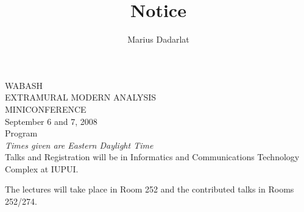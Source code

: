 \documentclass[10pt]{article}                                  %
\title{Notice}                                               %
\author{Marius Dadarlat}                                          %
\begin{document}
\vspace{2ex}
\begin{center}
{\TitleFont WABASH}\\
\smallskip
{\SubTitleFont EXTRAMURAL MODERN ANALYSIS}\\
\smallskip
{\TitleFont MINICONFERENCE}\\
\vspace{.2in}
 {\DateFont   September 6 and 7, 2008}\\
\vspace{.2in}
{\TitleFont Program}\\[.2in]

{\em Times given are Eastern Daylight Time}\\[.3in]


Talks and Registration will be in Informatics and Communications Technology Complex at IUPUI.

 The
lectures will take place in Room 252 and the contributed talks in Rooms 252/274.
\end{center} \smallskip
\end{document}
